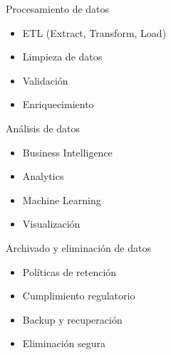 \documentclass{beamer}
\begin{document}
\begin{frame}{Procesamiento de datos}
    \begin{itemize}
        \item<1->[{\makebox[1em][c]{\textcolor{black}{\faCogs}}}] ETL (Extract, Transform, Load)
        \item<2->[{\makebox[1em][c]{\textcolor{black}{\faBug}}}] Limpieza de datos
        \item<3->[{\makebox[1em][c]{\textcolor{black}{\faCheck}}}] Validación
        \item<4->[{\makebox[1em][c]{\textcolor{black}{\faPlus}}}] Enriquecimiento
    \end{itemize}
\end{frame}

\begin{frame}{Análisis de datos}
    \begin{itemize}
        \raggedleft
        \item<1->[{\makebox[1em][c]{\textcolor{black}{\faBarChart}}}] Business Intelligence
        \item<2->[{\makebox[1em][c]{\textcolor{black}{\faLineChart}}}] Analytics
        \item<3->[{\makebox[1em][c]{\textcolor{black}{\faCogs}}}] Machine Learning
        \item<4->[{\makebox[1em][c]{\textcolor{black}{\faPieChart}}}] Visualización
    \end{itemize}
\end{frame}

\begin{frame}{Archivado y eliminación de datos}
    \begin{itemize}
        \item<1->[{\makebox[1em][c]{\textcolor{black}{\faArchive}}}] Políticas de retención
        \item<2->[{\makebox[1em][c]{\textcolor{black}{\faGavel}}}] Cumplimiento regulatorio
        \item<3->[{\makebox[1em][c]{\textcolor{black}{\faSave}}}] Backup y recuperación
        \item<4->[{\makebox[1em][c]{\textcolor{black}{\faTrash}}}] Eliminación segura
    \end{itemize}
\end{frame}
\end{document}
